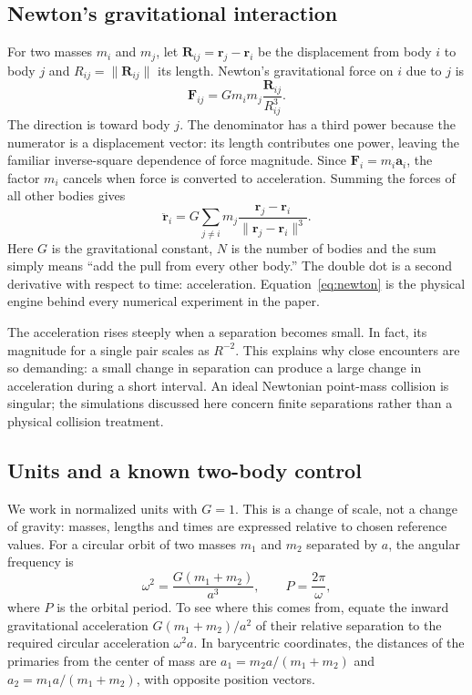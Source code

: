 \documentclass[10pt,letterpaper,twocolumn]{article}
\begin{document}
\subsection{Newton's gravitational interaction}
For two masses $m_i$ and $m_j$, let $\boldsymbol R_{ij}=\boldsymbol r_j-\boldsymbol r_i$ be the displacement from body $i$ to body $j$ and $R_{ij}=\lVert\boldsymbol R_{ij}\rVert$ its length. Newton's gravitational force on $i$ due to $j$ is
\begin{equation}
 \boldsymbol F_{ij}=Gm_im_j\frac{\boldsymbol R_{ij}}{R_{ij}^{3}}.
\end{equation}
The direction is toward body $j$. The denominator has a third power because the numerator is a displacement vector: its length contributes one power, leaving the familiar inverse-square dependence of force magnitude. Since $\boldsymbol F_i=m_i\boldsymbol a_i$, the factor $m_i$ cancels when force is converted to acceleration. Summing the forces of all other bodies gives
\begin{equation}\label{eq:newton}
 \boxed{\ddot{\boldsymbol r}_i=G\sum_{j\ne i}m_j
 \frac{\boldsymbol r_j-\boldsymbol r_i}
 {\lVert\boldsymbol r_j-\boldsymbol r_i\rVert^{3}}.}
\end{equation}
Here $G$ is the gravitational constant, $N$ is the number of bodies and the sum simply means ``add the pull from every other body.'' The double dot is a second derivative with respect to time: acceleration. Equation~\eqref{eq:newton} is the physical engine behind every numerical experiment in the paper.

The acceleration rises steeply when a separation becomes small. In fact, its magnitude for a single pair scales as $R^{-2}$. This explains why close encounters are so demanding: a small change in separation can produce a large change in acceleration during a short interval. An ideal Newtonian point-mass collision is singular; the simulations discussed here concern finite separations rather than a physical collision treatment.

\subsection{Units and a known two-body control}
We work in normalized units with $G=1$. This is a change of scale, not a change of gravity: masses, lengths and times are expressed relative to chosen reference values. For a circular orbit of two masses $m_1$ and $m_2$ separated by $a$, the angular frequency is
\begin{equation}\label{eq:omega}
 \omega^2=\frac{G(m_1+m_2)}{a^3},\qquad
 P=\frac{2\pi}{\omega},
\end{equation}
where $P$ is the orbital period. To see where this comes from, equate the inward gravitational acceleration $G(m_1+m_2)/a^2$ of their relative separation to the required circular acceleration $\omega^2a$. In barycentric coordinates, the distances of the primaries from the center of mass are $a_1=m_2a/(m_1+m_2)$ and $a_2=m_1a/(m_1+m_2)$, with opposite position vectors.
\end{document}
